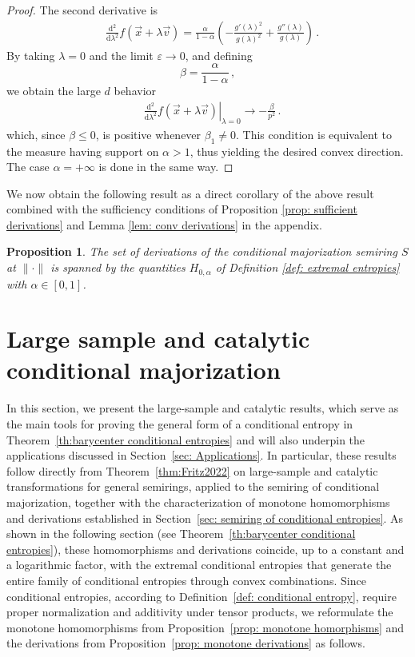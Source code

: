 \documentclass[aps,pra,11pt,onecolumn,nofootinbib,tightenlines]{revtex4-2}
\newtheorem{proposition}[theorem]{Proposition}
\theoremstyle{definition}
\def \d {\mathrm{d}}
\begin{document}
\begin{proof}
 The second derivative is
 \begin{align}
     &\frac{\d^2}{\d \lambda^2}f(\vec{x}+\lambda\vec{v}) =\frac{\alpha}{1-\alpha}\left(-\frac{g'(\lambda)^2}{g(\lambda)^2}+\frac{g'' (\lambda)}{g(\lambda)}\right) \,.
 \end{align}
 By taking $\lambda=0$ and the limit $\varepsilon \rightarrow 0$, and defining 
 \begin{equation}
 \beta= \frac{\alpha}{1-\alpha}  \,,
 \end{equation}
we obtain the large $d$ behavior
 \begin{align}
     &\left.\frac{\d^2 }{\d\lambda^2}f(\vec{x}+\lambda\vec{v})\right\vert_{\lambda=0}  \rightarrow -\frac{\beta}{p^2} \,.
 \end{align}
 which, since $\beta \leq 0$, is positive whenever $\beta_1 \neq 0$. This condition is equivalent to the measure having support on $\alpha > 1$, thus yielding the desired convex direction. The case $\alpha=+\infty$ is done in the same way. 
 \end{proof}

We now obtain the following result as a direct corollary of the above result combined with the sufficiency conditions of Proposition \ref{prop: sufficient derivations} and Lemma \ref{lem: conv derivations} in the appendix.

\begin{proposition}\label{prop:Derivations}
The set of derivations of the conditional majorization semiring $S$ at $\|\cdot\|$ is spanned by the quantities $H_{0,\alpha}$ of Definition \ref{def: extremal entropies} with $\alpha\in[0,1]$.
\end{proposition}

\section{Large sample and catalytic conditional majorization}
\label{sec: large sample}
In this section, we present the large-sample and catalytic results, which serve as the main tools for proving the general form of a conditional entropy in Theorem~\ref{th:barycenter conditional entropies} and will also underpin the applications discussed in Section~\ref{sec: Applications}.
In particular, these results follow directly from Theorem~\ref{thm:Fritz2022} on large-sample and catalytic transformations for general semirings, applied to the semiring of conditional majorization, together with the characterization of monotone homomorphisms and derivations established in Section~\ref{sec: semiring of conditional entropies}. 
As shown in the following section (see Theorem~\ref{th:barycenter conditional entropies}), these homomorphisms and derivations coincide, up to a constant and a logarithmic factor, with the extremal conditional entropies that generate the entire family of conditional entropies through convex combinations.
Since conditional entropies, according to Definition~\ref{def: conditional entropy}, require proper normalization and additivity under tensor products, we reformulate the monotone homomorphisms from Proposition~\ref{prop: monotone homorphisms} and the derivations from Proposition~\ref{prop: monotone derivations} as follows. 
\end{document}
